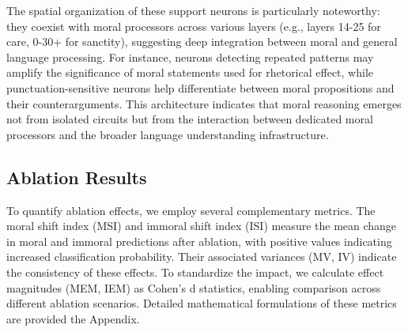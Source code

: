 \documentclass[runninghheads]{llncs}
\begin{document}
The spatial organization of these support neurons is particularly noteworthy: they coexist with moral processors across various layers (e.g., layers 14-25 for care, 0-30+ for sanctity), suggesting deep integration between moral and general language processing. For instance, neurons detecting repeated patterns may amplify the significance of moral statements used for rhetorical effect, while punctuation-sensitive neurons help differentiate between moral propositions and their counterarguments. This architecture indicates that moral reasoning emerges not from isolated circuits but from the interaction between dedicated moral processors and the broader language understanding infrastructure.










\subsection{Ablation Results}


To quantify ablation effects, we employ several complementary metrics. The moral shift index (MSI) and immoral shift index (ISI) measure the mean change in moral and immoral predictions after ablation, with positive values indicating increased classification probability. Their associated variances (MV, IV) indicate the consistency of these effects. To standardize the impact, we calculate effect magnitudes (MEM, IEM) as Cohen's d statistics, enabling comparison across different ablation scenarios. Detailed mathematical formulations of these metrics are provided the Appendix.
\end{document}
